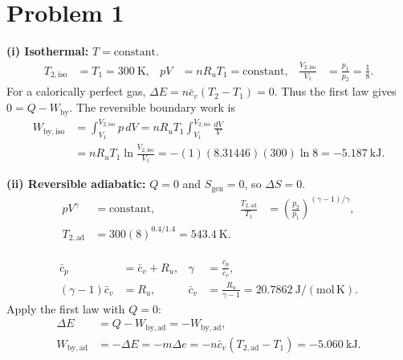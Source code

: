 \section*{Problem 1}

\textbf{(i) Isothermal:} $T=\text{constant}$.
\begin{align*}
T_{2,\mathrm{iso}}&=T_1=\boxed{300~\mathrm{K}},
& pV&=nR_uT_1=\text{constant},
& \frac{V_{2,\mathrm{iso}}}{V_1}&=\frac{p_1}{p_2}=\frac18.
\end{align*}
For a calorically perfect gas, $\Delta E=n\bar c_v(T_2-T_1)=0$.
Thus the first law gives $0=Q-W_{\mathrm{by}}$.
The reversible boundary work is
\begin{align*}
W_{\mathrm{by,iso}}
&=\int_{V_1}^{V_{2,\mathrm{iso}}}p\,dV
 =nR_uT_1\int_{V_1}^{V_{2,\mathrm{iso}}}\frac{dV}{V}\\
&=nR_uT_1\ln\frac{V_{2,\mathrm{iso}}}{V_1}
 =-(1)(8.31446)(300)\ln8
 =\boxed{-5.187~\mathrm{kJ}}.
\end{align*}

\smallskip
\noindent\textbf{(ii) Reversible adiabatic:} $Q=0$ and $S_{\mathrm{gen}}=0$,
so $\Delta S=0$.
\begin{align*}
pV^\gamma&=\text{constant},
& \frac{T_{2,\mathrm{ad}}}{T_1}
 &=\left(\frac{p_2}{p_1}\right)^{(\gamma-1)/\gamma},\\
T_{2,\mathrm{ad}}&=300(8)^{0.4/1.4}
 =\boxed{543.4~\mathrm{K}}.
\end{align*}

\begin{align*}
\bar c_p&=\bar c_v+R_u,
& \gamma&=\frac{\bar c_p}{\bar c_v},\\
(\gamma-1)\bar c_v&=R_u,
& \bar c_v&=\frac{R_u}{\gamma-1}
 =20.7862~\mathrm{J/(mol\,K)}.
\end{align*}
Apply the first law with $Q=0$:
\begin{align*}
\Delta E&=Q-W_{\mathrm{by,ad}}=-W_{\mathrm{by,ad}},\\
W_{\mathrm{by,ad}}&=-\Delta E=-m\Delta e
 =-n\bar c_v(T_{2,\mathrm{ad}}-T_1)
 =\boxed{-5.060~\mathrm{kJ}}.
\end{align*}

